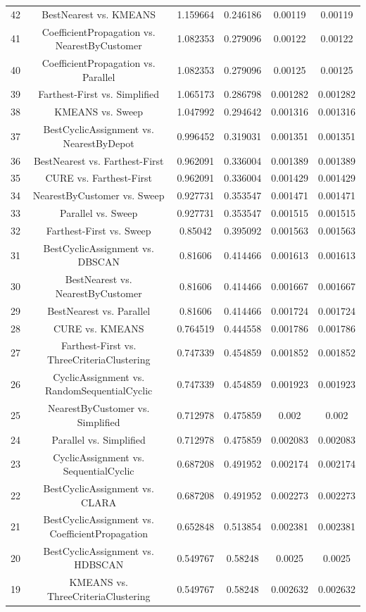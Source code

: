 \documentclass[a4paper,10pt]{article}
\begin{document}
\begin{landscape}
\begin{table}[!htp]
\begin{tabular}{cccccc}
42&BestNearest vs. KMEANS&1.159664&0.246186&0.00119&0.00119\\
41&CoefficientPropagation vs. NearestByCustomer&1.082353&0.279096&0.00122&0.00122\\
40&CoefficientPropagation vs. Parallel&1.082353&0.279096&0.00125&0.00125\\
39&Farthest-First vs. Simplified&1.065173&0.286798&0.001282&0.001282\\
38&KMEANS vs. Sweep&1.047992&0.294642&0.001316&0.001316\\
37&BestCyclicAssignment vs. NearestByDepot&0.996452&0.319031&0.001351&0.001351\\
36&BestNearest vs. Farthest-First&0.962091&0.336004&0.001389&0.001389\\
35&CURE vs. Farthest-First&0.962091&0.336004&0.001429&0.001429\\
34&NearestByCustomer vs. Sweep&0.927731&0.353547&0.001471&0.001471\\
33&Parallel vs. Sweep&0.927731&0.353547&0.001515&0.001515\\
32&Farthest-First vs. Sweep&0.85042&0.395092&0.001563&0.001563\\
31&BestCyclicAssignment vs. DBSCAN&0.81606&0.414466&0.001613&0.001613\\
30&BestNearest vs. NearestByCustomer&0.81606&0.414466&0.001667&0.001667\\
29&BestNearest vs. Parallel&0.81606&0.414466&0.001724&0.001724\\
28&CURE vs. KMEANS&0.764519&0.444558&0.001786&0.001786\\
27&Farthest-First vs. ThreeCriteriaClustering&0.747339&0.454859&0.001852&0.001852\\
26&CyclicAssignment vs. RandomSequentialCyclic&0.747339&0.454859&0.001923&0.001923\\
25&NearestByCustomer vs. Simplified&0.712978&0.475859&0.002&0.002\\
24&Parallel vs. Simplified&0.712978&0.475859&0.002083&0.002083\\
23&CyclicAssignment vs. SequentialCyclic&0.687208&0.491952&0.002174&0.002174\\
22&BestCyclicAssignment vs. CLARA&0.687208&0.491952&0.002273&0.002273\\
21&BestCyclicAssignment vs. CoefficientPropagation&0.652848&0.513854&0.002381&0.002381\\
20&BestCyclicAssignment vs. HDBSCAN&0.549767&0.58248&0.0025&0.0025\\
19&KMEANS vs. ThreeCriteriaClustering&0.549767&0.58248&0.002632&0.002632\\

\end{tabular}
\end{table}
\end{landscape}
\end{document}
